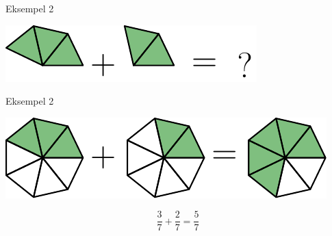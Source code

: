 \documentclass{beamer}
\begin{document}
\begin{frame}{Eksempel 2}
	\begin{center}
		\includegraphics{fig2b}
	\end{center}
\end{frame}

\begin{frame}{Eksempel 2}
	\begin{center}
		\includegraphics{fig2a2}
	\end{center}
\[ \frac{3}{7}+\frac{2}{7}=\frac{5}{7} \]
\end{frame}
\end{document}
